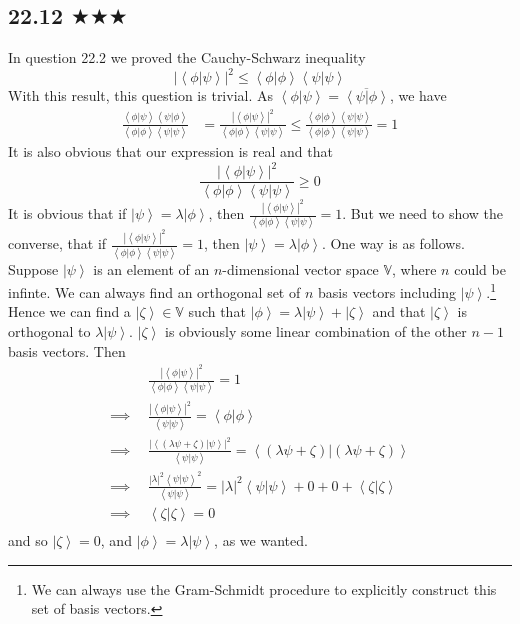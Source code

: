\subsection{22.12 $\bigstar \bigstar\bigstar$}
In question 22.2 we proved the Cauchy-Schwarz inequality
$$|\left<\phi|\psi\right >|^2\leq \left<\phi|\phi\right >\left<\psi|\psi\right >$$
With this result, this question is trivial. As $\left<\phi|\psi\right >=\overline{\left<\psi|\phi\right >}$, we have   
\begin{align*}
\frac{\left<\phi|\psi\right >\left<\psi|\phi\right >}{\left<\phi|\phi\right >\left<\psi|\psi\right >}&=\frac{|\left<\phi|\psi\right >|^2}{\left<\phi|\phi\right >\left<\psi|\psi\right >}\leq \frac{\left<\phi|\phi\right >\left<\psi|\psi\right> }{\left<\phi|\phi\right >\left<\psi|\psi\right >}=1
\end{align*}
It is also obvious that our expression is real and that
$$\frac{|\left<\phi|\psi\right >|^2}{\left<\phi|\phi\right >\left<\psi|\psi\right >}\geq 0$$
It is obvious that if $\left|\psi\right>=\lambda \left|\phi\right>$, then 
$\frac{|\left<\phi|\psi\right >|^2}{\left<\phi|\phi\right >\left<\psi|\psi\right >}=1$. But we need to show the converse, that if $\frac{|\left<\phi|\psi\right >|^2}{\left<\phi|\phi\right >\left<\psi|\psi\right >}=1$, then $\left|\psi\right>=\lambda \left|\phi\right>$. One way is as follows. Suppose $\left|\psi\right >$ is an element of an $n$-dimensional vector space $\mathbb{V}$, where $n$ could be infinte. We can always find an orthogonal set of $n$ basis vectors including $\left|\psi\right >$.\footnote{We can always use the Gram-Schmidt procedure to explicitly construct this set of basis vectors.} Hence we can find a $\left|\zeta\right >\in\mathbb{V}$ such that $\left|\phi\right >=\lambda\left|\psi\right >+\left|\zeta\right >$ and that $\left|\zeta\right >$ is orthogonal to $\lambda\left|\psi\right >$.  $\left|\zeta\right >$ is obviously some linear combination of the other $n-1$ basis vectors. Then
\begin{align*}
&\frac{|\left<\phi|\psi\right >|^2}{\left<\phi|\phi\right >\left<\psi|\psi\right >}=1\\
\implies \ \ &\frac{|\left<\phi|\psi\right >|^2}{\left<\psi|\psi\right >}=\left<\phi|\phi\right >\\ 
\implies \ \ &\frac{|\left<\right.(\lambda\psi+\zeta)\left|\psi\right >|^2}{\left<\psi|\psi\right >}=\left<(\lambda\psi+\zeta)|(\lambda\psi+\zeta)\right >\\ 
\implies \ \ &\frac{|\lambda|^2\left<\psi |\psi\right >^2}{\left<\psi|\psi\right >}=|\lambda|^2\left<\psi |\psi\right >+0+0+\left<\zeta |\zeta\right >\\
\implies \ \ &\left<\zeta |\zeta\right >=0\\
\end{align*}
and so $\left|\zeta\right >=0$, and $\left|\phi\right >=\lambda\left|\psi\right >$, as we wanted.


